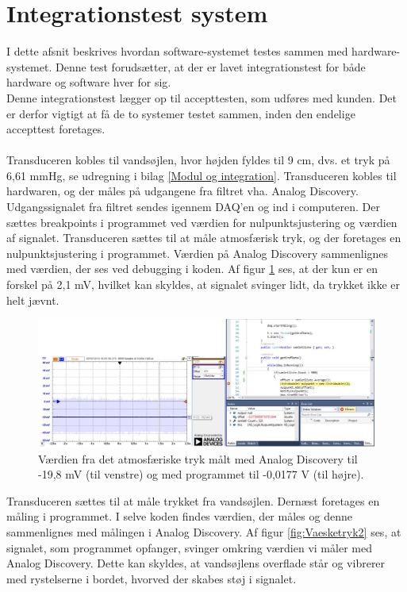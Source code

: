 \section{Integrationstest system}
I dette afsnit beskrives hvordan software-systemet testes sammen med hardware-systemet. Denne test forudsætter, at der er lavet integrationstest for både hardware og software hver for sig. \\
Denne integrationstest lægger op til accepttesten, som udføres med kunden. Det er derfor vigtigt at få de to systemer testet sammen, inden den endelige accepttest foretages. \\
\\
Transduceren kobles til vandsøjlen, hvor højden fyldes til 9 cm, dvs. et tryk på 6,61 mmHg, se udregning i bilag \ref{Modul og integration}. Transduceren kobles til hardwaren, og der måles på udgangene fra filtret vha. Analog Discovery. Udgangssignalet fra filtret sendes igennem DAQ’en og ind i computeren. Der sættes breakpoints i programmet ved værdien for nulpunktsjustering og værdien af signalet. 
Transduceren sættes til at måle atmosfærisk tryk, og der foretages en nulpunktsjustering i programmet. Værdien på Analog Discovery sammenlignes med værdien, der ses ved debugging i koden. Af figur \ref{fig:Atmosfaerisktryk} ses, at der kun er en forskel på 2,1 mV, hvilket kan skyldes, at signalet svinger lidt, da trykket ikke er helt jævnt.

\begin{figure}[H]
	\centering
	\includegraphics[width=1.2\textwidth]{Figurer/Test/Nulpunkt}
	\caption{Værdien fra det atmosfæriske tryk målt med Analog Discovery til -19,8 mV (til venstre) og med programmet til -0,0177 V (til højre).}
	\label{fig:Atmosfaerisktryk}
\end{figure}

Transduceren sættes til at måle trykket fra vandsøjlen. Dernæst foretages en måling i programmet. I selve koden findes værdien, der måles og denne sammenlignes med målingen i Analog Discovery. Af figur \ref{fig:Vaesketryk2} ses, at signalet, som programmet opfanger, svinger omkring værdien vi måler med Analog Discovery. Dette kan skyldes, at vandsøjlens overflade står og vibrerer med rystelserne i bordet, hvorved der skabes støj i signalet.

